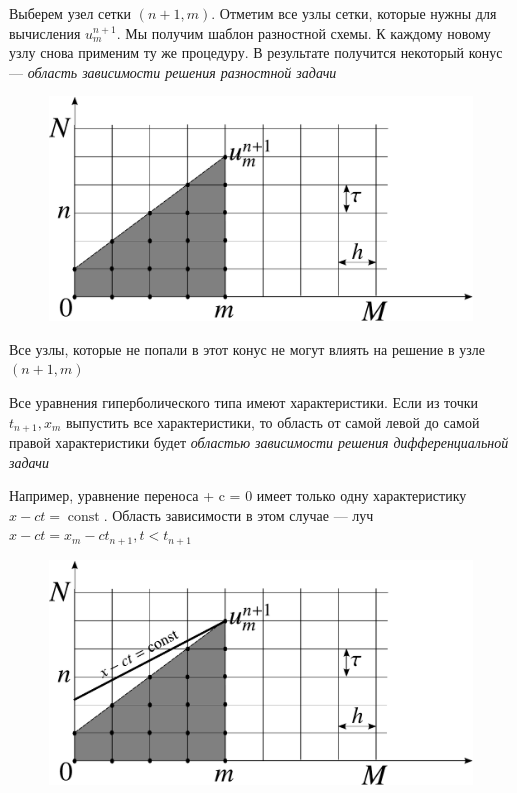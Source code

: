 \documentclass[professionalfonts,compress,unicode]{beamer}
\def\[#1\]{\begin{align*}#1\end{align*}}
\begin{document}

{
	Выберем узел сетки $(n+1,m)$. Отметим все узлы сетки, которые нужны для вычисления $u^{n+1}_{m}$. 
	Мы получим шаблон разностной схемы. К каждому новому узлу снова применим ту же процедуру.
	В результате получится некоторый конус --- \emph{область зависимости решения разностной задачи}
	\begin{figure}%
	\includegraphics[width=0.6\columnwidth]{grid_dep.pdf}%
	\end{figure}	
	Все узлы, которые не попали в этот конус не могут влиять на решение в узле $(n+1,m)$
}

{
	Все уравнения гиперболического типа имеют характеристики. 
	Если из точки $t_{n+1}, x_m$ выпустить все характеристики, то область от самой левой
	до самой правой характеристики будет \emph{областью зависимости решения дифференциальной задачи}
	
	Например, уравнение переноса 
	\[
	\frac{\partial u}{\partial t} + c  = 0
	\]
	имеет только одну характеристику $x - ct = \operatorname{const}$. Область зависимости в этом случае --- луч
	$x - ct = x_m - ct_{n+1}, t < t_{n+1}$
	\begin{figure}%
	\includegraphics[width=0.5\columnwidth]{grid_dep2.pdf}%
	\end{figure}		
}
\end{document}
